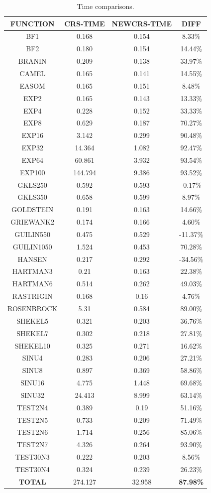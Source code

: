\documentclass[symmetry,article,submit,moreauthors,pdftex]{Definitions/mdpi}
\begin{document}
\begin{table}
\caption{Time comparisons.\label{tab:Experimenting-with-time}}

\begin{centering}
\begin{tabular}{|c|c|c|c|}
\hline 
FUNCTION & CRS-TIME & NEWCRS-TIME & DIFF \tabularnewline
\hline 
\hline 
BF1 & 0.168 & 0.154 & 8.33\% \tabularnewline
\hline 
BF2 & 0.180 & 0.154 & 14.44\% \tabularnewline
\hline 
BRANIN & 0.209 & 0.138 & 33.97\% \tabularnewline
\hline 
CAMEL & 0.165 & 0.141 & 14.55\% \tabularnewline
\hline 
EASOM & 0.165 & 0.151 & 8.48\% \tabularnewline
\hline 
EXP2 & 0.165 & 0.143 & 13.33\% \tabularnewline
\hline 
EXP4 & 0.228 & 0.152 & 33.33\% \tabularnewline
\hline 
EXP8 & 0.629 & 0.187 & 70.27\% \tabularnewline
\hline 
EXP16 & 3.142 & 0.299 & 90.48\% \tabularnewline
\hline 
EXP32 & 14.364 & 1.082 & 92.47\% \tabularnewline
\hline 
EXP64 & 60.861 & 3.932 & 93.54\%\tabularnewline
\hline 
EXP100 & 144.794 & 9.386 & 93.52\% \tabularnewline
\hline 
GKLS250 & 0.592 & 0.593 & -0.17\%  \tabularnewline
\hline 
GKLS350 & 0.658 & 0.599 & 8.97\%  \tabularnewline
\hline 
GOLDSTEIN & 0.191 & 0.163 & 14.66\% \tabularnewline
\hline 
GRIEWANK2 & 0.174 & 0.166 & 4.60\%\tabularnewline
\hline 
GUILIN550 & 0.475 & 0.529 & -11.37\% \tabularnewline
\hline 
GUILIN1050 & 1.524 & 0.453 & 70.28\% \tabularnewline
\hline 
HANSEN & 0.217 & 0.292 & -34.56\% \tabularnewline
\hline 
HARTMAN3 & 0.21 & 0.163 & 22.38\% \tabularnewline
\hline 
HARTMAN6 & 0.514 & 0.262 & 49.03\% \tabularnewline
\hline 
RASTRIGIN & 0.168 & 0.16 & 4.76\% \tabularnewline
\hline 
ROSENBROCK & 5.31 & 0.584 & 89.00\% \tabularnewline
\hline 
SHEKEL5 & 0.321 & 0.203 & 36.76\% \tabularnewline
\hline 
SHEKEL7 & 0.302 & 0.218 & 27.81\% \tabularnewline
\hline 
SHEKEL10 & 0.325 & 0.271 & 16.62\% \tabularnewline
\hline 
SINU4 & 0.283 & 0.206 & 27.21\% \tabularnewline
\hline 
SINU8 & 0.897 & 0.369 & 58.86\% \tabularnewline
\hline 
SINU16 & 4.775 & 1.448 & 69.68\% \tabularnewline
\hline 
SINU32 & 24.413 & 8.999 & 63.14\% \tabularnewline
\hline 
TEST2N4 & 0.389 & 0.19 & 51.16\% \tabularnewline
\hline 
TEST2N5 & 0.733 & 0.209 & 71.49\% \tabularnewline
\hline 
TEST2N6 & 1.714 & 0.256 & 85.06\% \tabularnewline
\hline 
TEST2N7 & 4.326 & 0.264 & 93.90\% \tabularnewline
\hline 
TEST30N3 & 0.222 & 0.203 & 8.56\% \tabularnewline
\hline 
TEST30N4 & 0.324 & 0.239 & 26.23\% \tabularnewline
\hline 
\textbf{TOTAL} & 274.127 & 32.958 & \textbf{87.98\%} \tabularnewline
\hline 
\end{tabular}
\par\end{centering}
\end{table}
\end{document}

